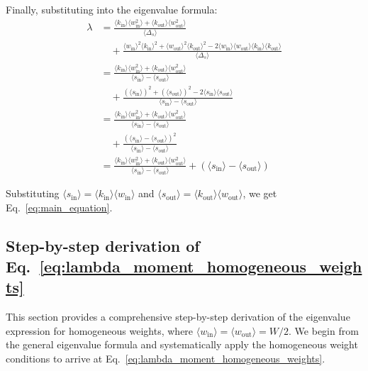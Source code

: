 \documentclass[a4paper,pre,superscriptaddress,floatfix,nofootinbib,twocolumn]{revtex4-1}
\begin{document}
Finally, substituting into the eigenvalue formula:
\begin{align*}
\lambda &= \frac{\langle k_{\text{in}} \rangle \langle w^2_\text{in} \rangle + \langle k_{\text{out}} \rangle \langle w^2_\text{out} \rangle}{\langle \Delta_{s} \rangle} \\
&\quad + \frac{\langle w_\text{in} \rangle^2 \langle k_{\text{in}} \rangle^2 + \langle w_\text{out} \rangle^2 \langle k_{\text{out}} \rangle^2 - 2 \langle w_\text{in} \rangle \langle w_\text{out} \rangle \langle k_{\text{in}} \rangle \langle k_{\text{out}} \rangle}{\langle \Delta_{s} \rangle}\\
&= \frac{\langle k_{\text{in}} \rangle \langle w^2_\text{in} \rangle + \langle k_{\text{out}} \rangle \langle w^2_\text{out} \rangle}{\langle s_\text{in} \rangle - \langle s_\text{out} \rangle} \\
&\quad + \frac{(\langle s_\text{in} \rangle)^2 + (\langle s_\text{out} \rangle)^2 - 2 \langle s_\text{in} \rangle \langle s_\text{out} \rangle}{\langle s_\text{in} \rangle - \langle s_\text{out} \rangle}\\
&= \frac{\langle k_{\text{in}} \rangle \langle w^2_\text{in} \rangle + \langle k_{\text{out}} \rangle \langle w^2_\text{out} \rangle}{\langle s_\text{in} \rangle - \langle s_\text{out} \rangle} \\
&\quad + \frac{(\langle s_\text{in} \rangle - \langle s_\text{out} \rangle)^2}{\langle s_\text{in} \rangle - \langle s_\text{out} \rangle}\\
&= \frac{\langle k_{\text{in}} \rangle \langle w^2_\text{in} \rangle + \langle k_{\text{out}} \rangle \langle w^2_\text{out} \rangle}{\langle s_\text{in} \rangle - \langle s_\text{out} \rangle} + (\langle s_\text{in} \rangle - \langle s_\text{out} \rangle)
\end{align*}

Substituting $\langle s_\text{in} \rangle = \langle k_{\text{in}} \rangle \langle w_\text{in} \rangle$ and $\langle s_\text{out} \rangle = \langle k_{\text{out}} \rangle \langle w_\text{out} \rangle$, we get Eq.~\eqref{eq:main_equation}.




\subsection*{Step-by-step derivation of Eq.~\eqref{eq:lambda_moment_homogeneous_weights}}
\label{sec:derivation_of_lambda}
\label{sec:detailed_derivation_homogeneous}

This section provides a comprehensive step-by-step derivation of the eigenvalue expression for homogeneous weights, where
$\langle w_\text{in} \rangle = \langle w_\text{out} \rangle = W/2$.
We begin from the general eigenvalue formula and systematically apply the homogeneous weight conditions to arrive at Eq.~\eqref{eq:lambda_moment_homogeneous_weights}.
\end{document}
